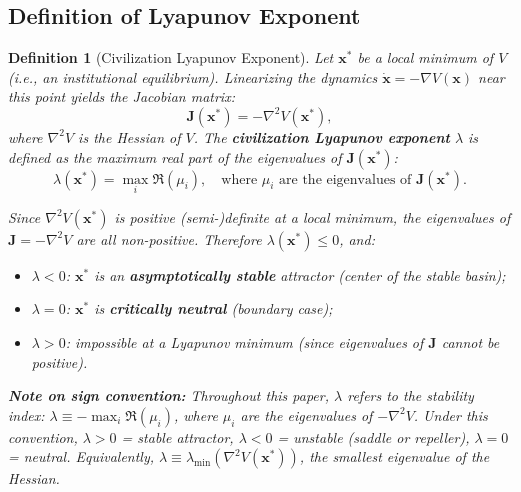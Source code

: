 \documentclass[12pt,a4paper]{article}
\newtheorem{definition}[theorem]{Definition}
\theoremstyle{definition}
\newcommand{\lb}{\lambda}
\newcommand{\lambdamin}{\lambda_{\min}}
\newcommand{\Lyap}{V}
\newcommand{\grad}{\nabla}
\begin{document}
\subsection{Definition of Lyapunov Exponent}
\label{sec:lyap_exp}

\begin{definition}[Civilization Lyapunov Exponent]
\label{def:lambda}
Let $\mathbf{x}^*$ be a local minimum of $\Lyap$ (i.e., an institutional equilibrium). Linearizing the dynamics $\dot{\mathbf{x}} = -\grad \Lyap(\mathbf{x})$ near this point yields the Jacobian matrix:
\begin{equation}\label{eq:jacobian}
    \mathbf{J}(\mathbf{x}^*) = -\nabla^2 \Lyap(\mathbf{x}^*),
\end{equation}
where $\nabla^2 \Lyap$ is the Hessian of $\Lyap$. The \textbf{civilization Lyapunov exponent} $\lb$ is defined as the maximum real part of the eigenvalues of $\mathbf{J}(\mathbf{x}^*)$:
\begin{equation}\label{eq:lambda_def}
    \lb(\mathbf{x}^*) = \max_{i} \Re(\mu_i), \quad \text{where } \mu_i \text{ are the eigenvalues of } \mathbf{J}(\mathbf{x}^*).
\end{equation}

Since $\nabla^2 \Lyap(\mathbf{x}^*)$ is positive (semi-)definite at a local minimum, the eigenvalues of $\mathbf{J} = -\nabla^2 \Lyap$ are all non-positive. Therefore $\lb(\mathbf{x}^*) \leq 0$, and:
\begin{itemize}
    \item $\lb < 0$: $\mathbf{x}^*$ is an \textbf{asymptotically stable} attractor (center of the stable basin);
    \item $\lb = 0$: $\mathbf{x}^*$ is \textbf{critically neutral} (boundary case);
    \item $\lb > 0$: impossible at a Lyapunov minimum (since eigenvalues of $\mathbf{J}$ cannot be positive).
\end{itemize}

\textbf{Note on sign convention:} Throughout this paper, $\lb$ refers to the stability index: $\lb \equiv -\max_i \Re(\mu_i)$, where $\mu_i$ are the eigenvalues of $-\nabla^2 \Lyap$. Under this convention, $\lb > 0$ = stable attractor, $\lb < 0$ = unstable (saddle or repeller), $\lb = 0$ = neutral. Equivalently, $\lb \equiv \lambdamin(\nabla^2 \Lyap(\mathbf{x}^*))$, the smallest eigenvalue of the Hessian.
\end{definition}
\end{document}
